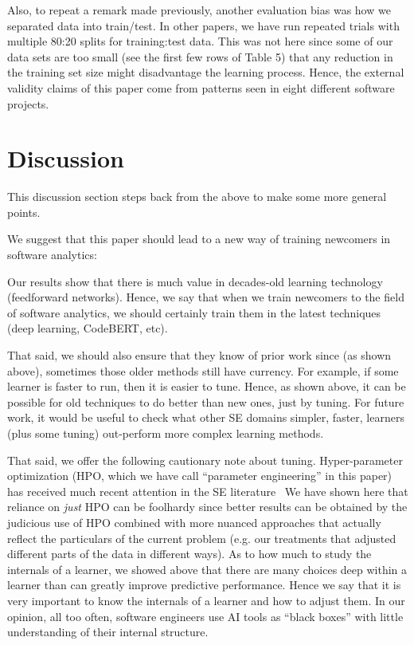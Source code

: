 Also, to repeat a remark made previously, another evaluation bias was how we separated data into train/test.  In other papers, we have run repeated
trials with multiple 80:20 splits for training:test data. This
was not here since some of our data sets are too small (see
the first few rows of Table 5) that any reduction in the
training set size might disadvantage the learning process.
Hence, the external validity claims of this paper come from
patterns seen in eight different software projects.
 
  

\section{Discussion}
\label{sec:discussion}

This discussion section steps back from the above to make some more general points.



We suggest that this paper should lead to a new way of training
newcomers in software analytics:
\bi
\item
Our results show that there is much value in decades-old learning technology
(feedforward networks). Hence, we say that when we train newcomers to the field of software analytics,
we should certainly train them in the latest techniques (deep learning, CodeBERT, etc).
\item
That said,
we should also ensure that they know of prior work since (as shown above), sometimes
those older methods still have currency. 
For example,
if some learner is faster to run, then it is easier to tune. 
Hence, as shown above, it can be possible for old techniques to do better than new ones, just by tuning.  
\ei
   For future work, it would be useful to check what other SE domains
    simpler, faster, learners  (plus some tuning)
   out-perform more complex learning methods.


That said, we offer the following cautionary note about tuning.
Hyper-parameter  optimization (HPO, which  we have call ``parameter engineering'' in this paper)
  has received much recent attention in the SE literature~\cite{agrawal2019dodge,yedida2021value,agrawal2021simpler} 
We have shown here that reliance on {\em just} HPO can be foolhardy
since better results can be obtained by the 
judicious  use of HPO combined with more nuanced approaches that actually reflect the particulars of the
current problem (e.g. our treatments that adjusted different parts of the data in different ways).
As to how much to study the internals of a learner,
we showed above  that there are many choices deep within a learner than can greatly improve predictive performance.  Hence we say that it   is very important to know the internals of a learner and how to adjust them.
In our opinion, all too often, software engineers use AI tools as ``black boxes'' with little
understanding of their internal structure. 

